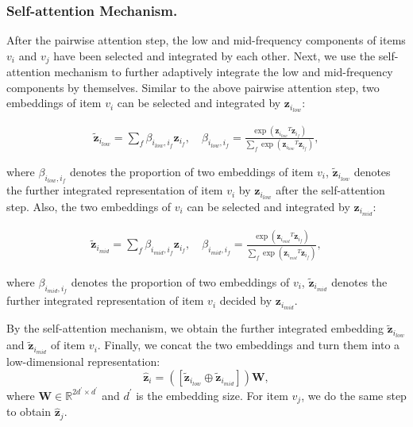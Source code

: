 \documentclass[letterpaper]{article} %
\begin{document}
\subsubsection{Self-attention Mechanism.}
After the pairwise attention step, the low and mid-frequency components of items $v_i$ and $v_j$ have been selected and integrated by each other. Next, we use the self-attention mechanism to further adaptively integrate the low and mid-frequency components by themselves. Similar to the above pairwise attention step, two embeddings of item $v_i$ can be selected and integrated by $\mathbf{z}_{i_{low}}$:
\begin{small}
\begin{gather}
   \mathbf{\widetilde{z}}_{i_{low}}=\sum_{f}\beta_{i_{low},i_{f}}\mathbf{z}_{i_f}, \quad
   \beta_{i_{low},i_f}=\frac{\exp({\mathbf{z}_{i_{low}}}^T\mathbf{z}_{i_f})}{\sum_f\exp({\mathbf{z}_{i_{low}}}^T\mathbf{z}_{i_f})},
   \label{eq:self_low}
\end{gather}
\end{small}
where $\beta_{i_{low},i_f}$ denotes the proportion of two embeddings of item $v_i$, $\mathbf{\widetilde{z}}_{i_{low}}$ denotes the further integrated representation of item $v_i$ by $\mathbf{z}_{i_{low}}$ after the self-attention step.
Also, the two embeddings of $v_i$ can be selected and integrated by $\mathbf{z}_{i_{mid}}$:
\begin{small}
\begin{gather}
   \mathbf{\widetilde{z}}_{i_{mid}}=\sum_{f}\beta_{i_{mid},i_{f}}\mathbf{z}_{i_f}, \quad
   \beta_{i_{mid},i_f}=\frac{\exp({\mathbf{z}_{i_{mid}}}^T\mathbf{z}_{i_f})}{\sum_f\exp({\mathbf{z}_{i_{mid}}}^T\mathbf{z}_{i_f})},
   \label{eq:self_mid}
\end{gather}
\end{small}
where $\beta_{i_{mid},i_f}$ denotes the proportion of two embeddings of $v_i$, $\mathbf{\widetilde{z}}_{i_{mid}}$ denotes the further integrated representation of item $v_i$ decided by $\mathbf{z}_{i_{mid}}$.


By the self-attention mechanism, we obtain the further integrated embedding $\mathbf{\widetilde{z}}_{i_{low}}$ and $\mathbf{\widetilde{z}}_{i_{mid}}$ of item $v_i$. Finally, we concat the two embeddings and turn them into a low-dimensional representation:
\begin{equation}
   \mathbf{\hat{z}}_i=([\mathbf{\widetilde{z}}_{i_{low}} \oplus \mathbf{\widetilde{z}}_{i_{mid}}])\mathbf{W},
   \label{eq:final_eq}
\end{equation}
where $\mathbf{W} \in \mathbb{R}^{2d^{\prime}\times d^{\prime}}$ and $d^{\prime}$ is the embedding size. For item $v_j$, we do the same step to obtain $\mathbf{\hat{z}}_j$.
\end{document}
